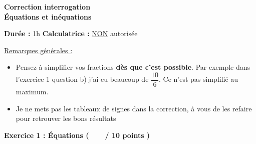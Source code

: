 \documentclass[12pt,a4paper]{exam}
\begin{document}
\begin{center}
    \Large\textbf{Correction interrogation\\Équations et inéquations}
\end{center}

\vspace{0.3cm}

\noindent
\textbf{Durée :} 1h \hfill
\textbf{Calculatrice :} \underline{NON} autorisée

\vspace{0.5cm}

\underline{Remarques générales :}
\vspace{5pt}
{\color{red}
\begin{itemize}
    \item Pensez à simplifier vos fractions \textbf{dès que c'est possible}. Par exemple dans 
    l'exercice 1 question b) j'ai eu beaucoup de $\dfrac{10}{6}$. Ce 
    n'est pas simplifié au maximum.
    \item Je ne mets pas les tableaux de signes dans la correction, à vous de les refaire pour retrouver 
    les bons résultats
\end{itemize}
}

\vspace{0.5cm}

\noindent
\textbf{Exercice 1 : Équations (\ \ \ \  / 10 points )}
\vspace{5pt}
\end{document}
